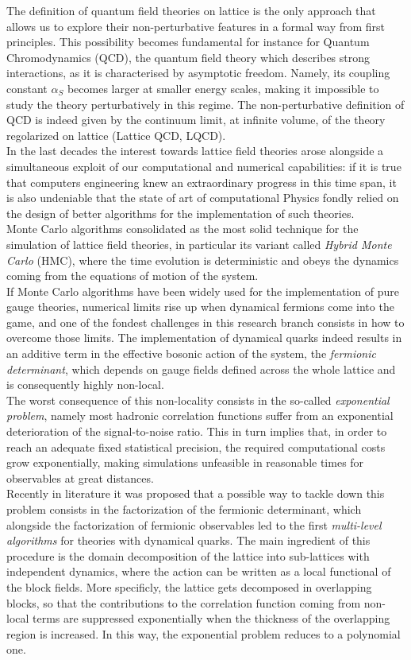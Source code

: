 \documentclass[corpo=11pt,english,numerazioneromana]{toptesi}
\begin{document}
\sommario
The definition of quantum field theories on lattice is the only approach that allows us to explore their non-perturbative features in a formal way from first principles. This possibility becomes fundamental for instance for Quantum Chromodynamics (QCD), the quantum field theory which describes strong interactions, as it is characterised by asymptotic freedom. Namely, its coupling constant $\alpha_S$ becomes larger at smaller energy scales, making it impossible to study the theory perturbatively in this regime. The non-perturbative definition of QCD is indeed given by the continuum limit, at infinite volume, of the theory regolarized on lattice (Lattice QCD, LQCD).
\\ In the last decades the interest towards lattice field theories arose alongside a simultaneous exploit of our computational and numerical capabilities: if it is true that computers engineering knew an extraordinary progress in this time span, it is also undeniable that the state of art of computational Physics fondly relied on the design of better algorithms for the implementation of such theories.
\\ Monte Carlo algorithms consolidated as the most solid technique for the simulation of lattice field theories, in particular its variant called \textit{Hybrid Monte Carlo} (HMC), where the time evolution is deterministic and obeys the dynamics coming from the equations of motion of the system. 
\\ If Monte Carlo algorithms have been widely used for the implementation of pure gauge theories, numerical limits rise up when dynamical fermions come into the game, and one of the fondest challenges in this research branch consists in how to overcome those limits. The implementation of dynamical quarks indeed results in an additive term in the effective bosonic action of the system, the \textit{fermionic determinant}, which depends on gauge fields defined across the whole lattice and is consequently highly non-local.
\\ The worst consequence of this non-locality consists in the so-called \textit{exponential problem}, namely most hadronic correlation functions suffer from an exponential deterioration of the signal-to-noise ratio. This in turn implies that, in order to reach an adequate fixed statistical precision, the required computational costs grow exponentially, making simulations unfeasible in reasonable times for observables at great distances. 
\\ Recently in literature it was proposed that a possible way to tackle down this problem consists in the factorization of the fermionic determinant, which alongside the factorization of fermionic observables led to the first \textit{multi-level algorithms} for theories with dynamical quarks. The main ingredient of this procedure is the domain decomposition of the lattice into sub-lattices with independent dynamics, where the action can be written as a local functional of the block fields. More specificly, the lattice gets decomposed in overlapping blocks, so that the contributions to the correlation function coming from non-local terms are suppressed exponentially when the thickness of the overlapping region is increased. In this way, the exponential problem reduces to a polynomial one. 
\end{document}
